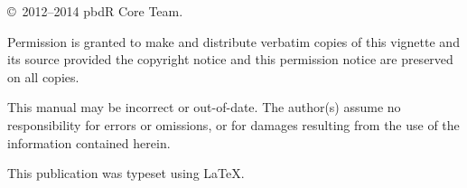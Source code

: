 \null
\vfill
\copyright\ 2012--2014 pbdR Core Team.

Permission is granted to make and distribute verbatim copies of
this vignette and its source provided the copyright notice and
this permission notice are preserved on all copies.

This manual may be incorrect or out-of-date.  The author(s) assume
no responsibility for errors or omissions, or for damages resulting
from the use of the information contained herein.

This publication was typeset using \LaTeX.
